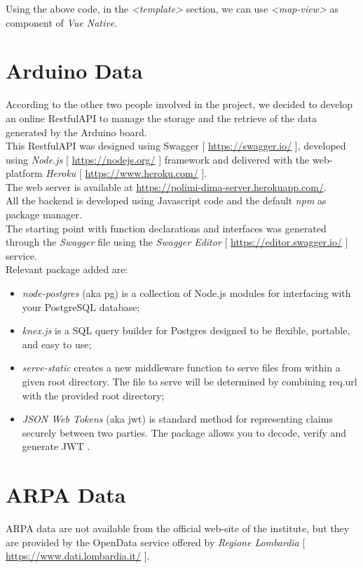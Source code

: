 Using the above code, in the \textit{<template>} section, we can use \textit{<map-view>} as component of \textit{Vue Native}.

\section{Arduino Data}
According to the other two people involved in the project, we decided to develop an online RestfulAPI to manage the storage and the retrieve of the data generated by the Arduino board.\\

This RestfulAPI was designed using Swagger [ \url{https://swagger.io/} ], developed using \textit{Node.js} [ \url{https://nodejs.org/} ] framework and delivered with the web-platform \textit{Heroku} [ \url{https://www.heroku.com/} ].\\

The web server is available at \url{https://polimi-dima-server.herokuapp.com/}.\\

All the backend is developed using Javascript code and the default \textit{npm} as package manager.\\

The starting point with function declarations and interfaces was generated through the \textit{Swagger} file using the \textit{Swagger Editor} [ \url{https://editor.swagger.io/} ] service.\\

Relevant package added are:
\begin{itemize}
    \item \textit{node-postgres} (aka pg) is a collection of Node.js modules for interfacing with your PostgreSQL database;
    \item \textit{knex.js} is a SQL query builder for Postgres designed to be flexible, portable, and easy to use;
    \item \textit{serve-static} creates a new middleware function to serve files from within a given root directory. The file to serve will be determined by combining req.url with the provided root directory;
    \item \textit{JSON Web Tokens} (aka jwt) is standard method for representing claims securely between two parties. The package allows you to decode, verify and generate JWT .
\end{itemize}

\section{ARPA Data}
ARPA data are not available from the official web-site of the institute, but they are provided by the OpenData service offered by \textit{Regione Lombardia} [ \url{https://www.dati.lombardia.it/} ].\\

